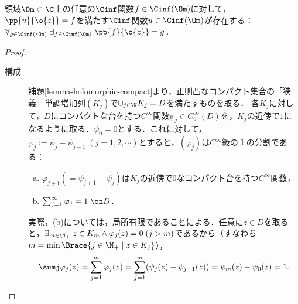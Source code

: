 \documentclass[uplatex, dvipdfmx]{jsreport}
\begin{document}
\begin{theorem}[コーシーリーマン作用素の全射性]\label{thm-Cauchy-Riemann-operator-is-epic}
    領域$\Om\subset\C$上の任意の$\Cinf$関数$f\in\Cinf(\Om)$に対して，$\pp{u}{\o{z}}=f$を満たす$\Cinf$関数$u\in\Cinf(\Om)$が存在する：$\forall_{g\in\Cinf(\Om)}\;\exists_{f\in\Cinf(\Om)}\;\pp{f}{\o{z}}=g$．
\end{theorem}
\begin{proof}\mbox{}
    \begin{description}
        \item[構成] 補題\ref{lemma-holomorphic-compact}より，正則凸なコンパクト集合の「狭義」単調増加列$(K_j)$で$\cup_{j\in\N}K_j=D$を満たすものを取る．
        各$K_j$に対して，$D$にコンパクトな台を持つ$C^\infty$関数$\psi_j\in C_0^\infty(D)$を，$K_j$の近傍で$1$になるように取る．$\psi_0=0$とする．これに対して，$\varphi_j:=\psi_j-\psi_{j-1}\;(j=1,2,\cdots)$とすると，$(\varphi_j)$は$C^\infty$級の１の分割である：
        \begin{enumerate}[(a)]
            \item $\varphi_{j+1}(=\psi_{j+1}-\psi_j)$は$K_j$の近傍で$0$なコンパクト台を持つ$C^\infty$関数，
            \item $\sum_{j=1}^\infty\varphi_j=1\;\on D$．
        \end{enumerate}
        実際，(b)については，局所有限であることによる．任意に$z\in D$を取ると，$\exists_{m\in\N_+}\;z\in K_m\land\varphi_j(z)=0\;(j>m)$であるから（すなわち$m=\min\Brace{j\in\N_+\mid z\in K_j}$），\[\sumj\varphi_j(z)=\sum_{j=1}^m\varphi_j(z)=\sum^m_{j=1}(\psi_j(z)-\psi_{j-1}(z))=\psi_m(z)-\psi_0(z)=1.\]


\end{description}
\end{proof}
\end{document}
